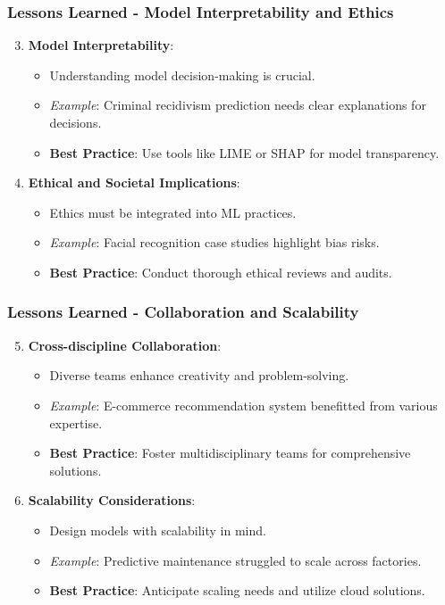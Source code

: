 \documentclass{beamer}
\begin{document}
\begin{frame}[fragile]
    \frametitle{Lessons Learned - Model Interpretability and Ethics}
    \begin{enumerate}
        \setcounter{enumi}{2}
        \item \textbf{Model Interpretability}:
        \begin{itemize}
            \item Understanding model decision-making is crucial.
            \item \textit{Example}: Criminal recidivism prediction needs clear explanations for decisions.
            \item \textbf{Best Practice}: Use tools like LIME or SHAP for model transparency.
        \end{itemize}

        \item \textbf{Ethical and Societal Implications}:
        \begin{itemize}
            \item Ethics must be integrated into ML practices.
            \item \textit{Example}: Facial recognition case studies highlight bias risks.
            \item \textbf{Best Practice}: Conduct thorough ethical reviews and audits.
        \end{itemize}
    \end{enumerate}
\end{frame}

\begin{frame}[fragile]
    \frametitle{Lessons Learned - Collaboration and Scalability}
    \begin{enumerate}
        \setcounter{enumi}{4}
        \item \textbf{Cross-discipline Collaboration}:
        \begin{itemize}
            \item Diverse teams enhance creativity and problem-solving.
            \item \textit{Example}: E-commerce recommendation system benefitted from various expertise.
            \item \textbf{Best Practice}: Foster multidisciplinary teams for comprehensive solutions.
        \end{itemize}

        \item \textbf{Scalability Considerations}:
        \begin{itemize}
            \item Design models with scalability in mind.
            \item \textit{Example}: Predictive maintenance struggled to scale across factories.
            \item \textbf{Best Practice}: Anticipate scaling needs and utilize cloud solutions.
        \end{itemize}
    \end{enumerate}
\end{frame}
\end{document}
